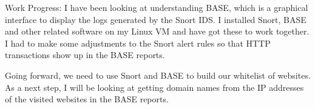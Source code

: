 Work Progress:
I have been looking at understanding BASE, which is a graphical interface to display the logs generated by the Snort IDS. I installed Snort, BASE and other related software on my Linux VM and have got these to work together. I had to make some adjustments to the Snort alert rules so that HTTP transactions show up in the BASE reports.

Going forward, we need to use Snort and BASE to build our whitelist of websites. As a next step, I will be looking at getting domain names from the IP addresses of the visited websites in the BASE reports.
